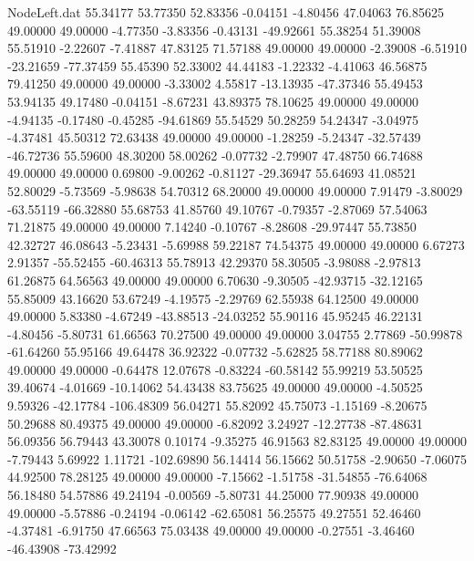 \begin{filecontents}{NodeLeft.dat}
  55.34177   53.77350   52.83356    -0.04151   -4.80456   47.04063   76.85625   49.00000   49.00000   -4.77350   -3.83356   -0.43131  -49.92661
  55.38254   51.39008   55.51910    -2.22607   -7.41887   47.83125   71.57188   49.00000   49.00000   -2.39008   -6.51910  -23.21659  -77.37459
  55.45390   52.33002   44.44183    -1.22332   -4.41063   46.56875   79.41250   49.00000   49.00000   -3.33002    4.55817  -13.13935  -47.37346
  55.49453   53.94135   49.17480    -0.04151   -8.67231   43.89375   78.10625   49.00000   49.00000   -4.94135   -0.17480   -0.45285  -94.61869
  55.54529   50.28259   54.24347    -3.04975   -4.37481   45.50312   72.63438   49.00000   49.00000   -1.28259   -5.24347  -32.57439  -46.72736
  55.59600   48.30200   58.00262    -0.07732   -2.79907   47.48750   66.74688   49.00000   49.00000    0.69800   -9.00262   -0.81127  -29.36947
  55.64693   41.08521   52.80029    -5.73569   -5.98638   54.70312   68.20000   49.00000   49.00000    7.91479   -3.80029  -63.55119  -66.32880
  55.68753   41.85760   49.10767    -0.79357   -2.87069   57.54063   71.21875   49.00000   49.00000    7.14240   -0.10767   -8.28608  -29.97447
  55.73850   42.32727   46.08643    -5.23431   -5.69988   59.22187   74.54375   49.00000   49.00000    6.67273    2.91357  -55.52455  -60.46313
  55.78913   42.29370   58.30505    -3.98088   -2.97813   61.26875   64.56563   49.00000   49.00000    6.70630   -9.30505  -42.93715  -32.12165
  55.85009   43.16620   53.67249    -4.19575   -2.29769   62.55938   64.12500   49.00000   49.00000    5.83380   -4.67249  -43.88513  -24.03252
  55.90116   45.95245   46.22131    -4.80456   -5.80731   61.66563   70.27500   49.00000   49.00000    3.04755    2.77869  -50.99878  -61.64260
  55.95166   49.64478   36.92322    -0.07732   -5.62825   58.77188   80.89062   49.00000   49.00000   -0.64478   12.07678   -0.83224  -60.58142
  55.99219   53.50525   39.40674    -4.01669  -10.14062   54.43438   83.75625   49.00000   49.00000   -4.50525    9.59326  -42.17784 -106.48309
  56.04271   55.82092   45.75073    -1.15169   -8.20675   50.29688   80.49375   49.00000   49.00000   -6.82092    3.24927  -12.27738  -87.48631
  56.09356   56.79443   43.30078     0.10174   -9.35275   46.91563   82.83125   49.00000   49.00000   -7.79443    5.69922    1.11721 -102.69890
  56.14414   56.15662   50.51758    -2.90650   -7.06075   44.92500   78.28125   49.00000   49.00000   -7.15662   -1.51758  -31.54855  -76.64068
  56.18480   54.57886   49.24194    -0.00569   -5.80731   44.25000   77.90938   49.00000   49.00000   -5.57886   -0.24194   -0.06142  -62.65081
  56.25575   49.27551   52.46460    -4.37481   -6.91750   47.66563   75.03438   49.00000   49.00000   -0.27551   -3.46460  -46.43908  -73.42992

\end{filecontents}

